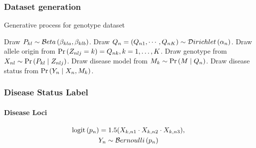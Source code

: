 \documentclass[xcolor=dvipsnames, professionalfont]{beamer}
\begin{document}
\begin{frame}
\frametitle{Dataset generation}
\begin{algorithm}[H]
\caption{Generative process for genotype dataset}
\label{alg:GenotypeGeneration}
\begin{algorithmic}
\State Draw $P_{kl} \sim \mathcal{B}eta \left( \beta_{kla}, \beta_{klb} \right)$.
	\State Draw $Q_n = ( Q_{n1}, \cdots, Q_{nK} ) \sim \mathcal{D}irichlet \left( \alpha_n \right)$.
		\State Draw allele origin from $\Pr \left( Z_{nlj} = k \right) = Q_{nk}, k = 1, \dots, K$.
		\State Draw genotype from $X_{nl} \sim \Pr \left( P_{kl} \mid Z_{nlj} \right)$.
	\EndFor
	\State Draw disease model from $M_k \sim \Pr \left( M \mid Q_n \right)$.
	\State Draw disease status from $\Pr \left( Y_n \mid X_n, M_k \right)$.
\EndFor
\end{algorithmic}
\end{algorithm}
\end{frame}

\begin{frame}
\frametitle{Disease Status Label}
\framesubtitle{Disease Loci}
\begin{table}[!ht]
\caption{Disease Model}
\label{tab:DiseaseModelSNPs}
\centering
{}
\end{table}
%
\begin{gather}
\operatorname{logit} \left( p_n \right) = 1.5 ( X_{k,n1} \cdot X_{k,n2} \cdot X_{k, n3} ),
\nonumber \\ %
Y_n \sim \Bernoulli{p_n}
\nonumber
\label{eq:LogitY}
\end{gather}
\end{frame}
\end{document}

